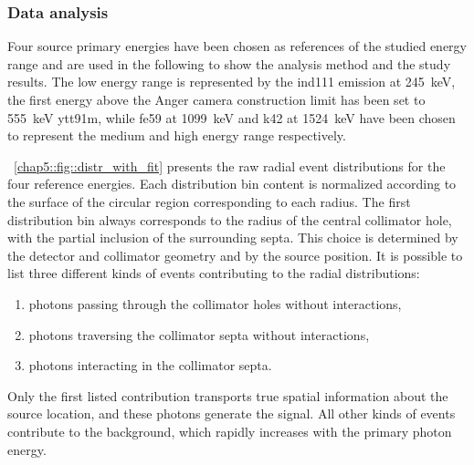 \subsubsection{Data analysis}\label{chap5::subsubsec::AC_dataTreat}
Four source primary energies have been chosen as references of the studied energy range and are used in the following to show the analysis method and the study results. The low energy range is represented by the \gls{ind111} emission at 245~keV, the first energy above the Anger camera construction limit has been set to 555~keV \gls{ytt91m}, while \gls{fe59} at 1099~keV and \gls{k42} at 1524~keV have been chosen to represent the medium and high energy range respectively. 

\figurename~\ref{chap5::fig::distr_with_fit} presents the raw radial event distributions for the four reference energies. Each distribution bin content is normalized according to the surface of the circular region corresponding to each radius. The first distribution bin always corresponds to the radius of the central collimator hole, with the partial inclusion of the surrounding septa. This choice is determined by the detector and collimator geometry and by the source position. It is possible to list three different kinds of events contributing to the radial distributions:
\begin{enumerate}
\item photons passing through the collimator holes without interactions,
\item photons traversing the collimator septa without interactions,
\item photons interacting in the collimator septa.
\end{enumerate} 
Only the first listed contribution transports true spatial information about the source location, and these photons generate the signal. All other kinds of events contribute to the background, which rapidly increases with the primary photon energy.

